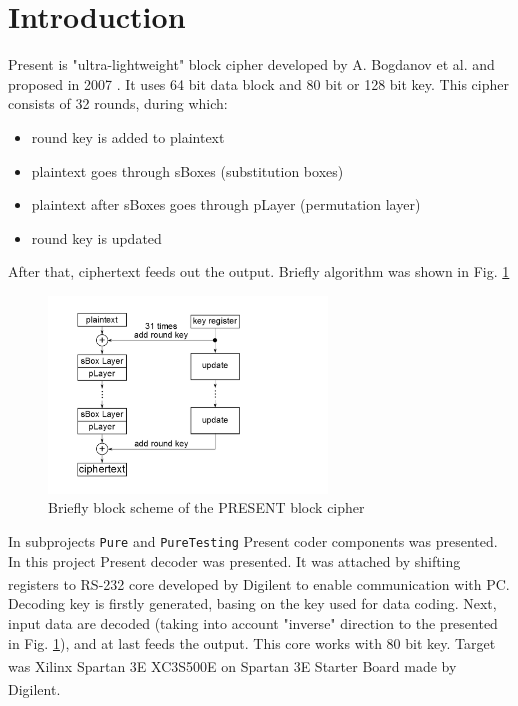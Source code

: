 \documentclass{gajewski}
\begin{document}
\maketitle

\newpage

\revisionTable

\newpage

\tableofcontents
\newpage

\section{Introduction}

Present is "ultra-lightweight" block cipher developed by A. Bogdanov et al. and proposed in 2007 \cite{PRESENT}. It uses 64 bit data block and 80 bit or 128 bit key.
This cipher consists of 32 rounds, during which: 
\begin{itemize}
    \item round key is added to plaintext
    \item plaintext goes through sBoxes (substitution boxes)
    \item plaintext after sBoxes goes through pLayer (permutation layer)
    \item round key is updated
\end{itemize}
After that, ciphertext feeds out the output. Briefly algorithm was shown in Fig. \ref{pAlgorithm}
\begin{figure}[!ht]%
    \begin{center}
    \includegraphics[width=0.66\textwidth]{img/presentAlgorithm.png}
    \caption{%
        Briefly block scheme of the PRESENT block cipher
     }%
    \label{pAlgorithm}
    \end{center}
 \end{figure}

In subprojects \texttt{Pure} and \texttt{PureTesting} Present coder components was presented. In this project Present decoder was presented. It was attached by shifting registers to RS-232 core developed by Digilent\textsuperscript{\textregistered} to enable communication with PC. Decoding key is firstly generated, basing on the key used for data coding. Next, input data are decoded (taking into account "inverse" direction to the presented in Fig. \ref{pAlgorithm}), and at last feeds the output. This core works with 80 bit key. Target was Xilinx\textsuperscript{\textregistered} Spartan 3E XC3S500E \cite{Spartan} on Spartan 3E  Starter Board \cite{Digilent} made by Digilent\textsuperscript{\textregistered}.
\end{document}
